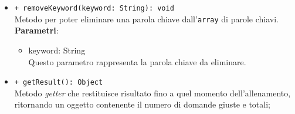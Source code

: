 \begin{itemize}
\begin{itemize}
				\item \texttt{+ removeKeyword(keyword: String): void} \\
				Metodo per poter eliminare una parola chiave dall'\texttt{array} di parole chiavi.\\
				\textbf{Parametri}:
				\begin{itemize}
					\item {keyword: String}\\
					Questo parametro rappresenta la parola chiave da eliminare.
				\end{itemize}
				
				\item \texttt{+ getResult(): Object} \\
				Metodo \textit{getter} che restituisce risultato fino a quel momento dell'allenamento, ritornando un oggetto contenente il numero di domande giuste e totali;
				
			\end{itemize}
		\end{itemize}
			
		